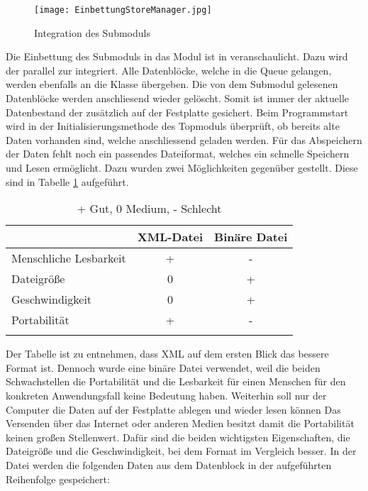 \begin{figure}[H]
\centering
\texttt{[image: EinbettungStoreManager.jpg]}
\caption{Integration des Submoduls }
\label{fig:EinbettungStoreManager}
\end{figure}

Die Einbettung des Submoduls  in das Modul  ist
in  veranschaulicht. Dazu wird der
 parallel zur  integriert. Alle
Datenblöcke, welche in die Queue gelangen, werden ebenfalls an die
Klasse  übergeben. Die von dem Submodul 
gelesenen Datenblöcke werden anschliesend wieder gelöscht. Somit ist immer der
aktuelle Datenbestand der 
zusätzlich auf der Festplatte gesichert. Beim Programmstart wird in der
Initialisierungsmethode des Topmoduls überprüft, ob bereits alte Daten vorhanden
sind, welche anschliessend geladen werden. \newline
Für das Abspeichern der
Daten fehlt noch ein passendes Dateiformat, welches ein schnelle Speichern und
Lesen ermöglicht. Dazu wurden zwei Möglichkeiten gegenüber gestellt. Diese sind
in Tabelle \ref{tab:Speicherformate} aufgeführt.

\begin{longtable}{|lcc|}
\caption{Vergleich der Speicherformate} \\
\hline
\label{tab:Speicherformate}
\textbf{} & \textbf{XML-Datei} & \textbf{Binäre Datei}\\
\hline
  Menschliche Lesbarkeit      &  + & - \\
  Dateigröße      &  0 & + \\
  Geschwindigkeit &  0 & + \\
  Portabilität    &  + & - \\
\hline
\caption*{ + Gut, 0 Medium, - Schlecht }
\end{longtable}

Der Tabelle ist zu entnehmen, dass XML auf dem ersten Blick das bessere Format
ist. Dennoch wurde eine binäre Datei verwendet, weil die beiden Schwachstellen
die Portabilität und die Lesbarkeit für einen Menschen für den konkreten
Anwendungsfall keine Bedeutung haben.
Weiterhin soll nur der Computer die Daten auf der Festplatte ablegen und
wieder lesen können Das Versenden über das Internet oder anderen
Medien besitzt damit die Portabilität keinen großen Stellenwert.
Dafür sind die beiden wichtigsten Eigenschaften, die Dateigröße und die
Geschwindigkeit, bei dem Format im Vergleich besser.
\newline
In der Datei werden die folgenden Daten aus dem Datenblock in der
aufgeführten Reihenfolge gespeichert:

